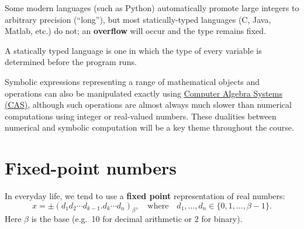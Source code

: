 \documentclass[
  letterpaper,
  DIV=11,
  numbers=noendperiod]{scrreprt}
\begin{document}
\begin{tcolorbox}[enhanced jigsaw, toptitle=1mm, breakable, colbacktitle=quarto-callout-note-color!10!white, colback=white, opacitybacktitle=0.6, rightrule=.15mm, bottomrule=.15mm, left=2mm, arc=.35mm, bottomtitle=1mm, title=\textcolor{quarto-callout-note-color}{\faInfo}\hspace{0.5em}{Note}, titlerule=0mm, toprule=.15mm, leftrule=.75mm, opacityback=0, colframe=quarto-callout-note-color-frame, coltitle=black]

Some modern languages (such as Python) automatically promote large
integers to arbitrary precision (``long''), but most statically-typed
languages (C, Java, Matlab, etc.) do not; an \textbf{overflow} will
occur and the type remains fixed.

\end{tcolorbox}

\begin{tcolorbox}[enhanced jigsaw, toptitle=1mm, breakable, colbacktitle=quarto-callout-note-color!10!white, colback=white, opacitybacktitle=0.6, rightrule=.15mm, bottomrule=.15mm, left=2mm, arc=.35mm, bottomtitle=1mm, title=\textcolor{quarto-callout-note-color}{\faInfo}\hspace{0.5em}{Note}, titlerule=0mm, toprule=.15mm, leftrule=.75mm, opacityback=0, colframe=quarto-callout-note-color-frame, coltitle=black]

A statically typed language is one in which the type of every variable
is determined before the program runs.

\end{tcolorbox}

Symbolic expressions representing a range of mathematical objects and
operations can also be manipulated exactly using
\href{https://en.wikipedia.org/wiki/Computer_algebra_system}{Computer
Algebra Systems (CAS)}, although such operations are almost always much
slower than numerical computations using integer or real-valued numbers.
These dualities between numerical and symbolic computation will be a key
theme throughout the course.

\section{Fixed-point numbers}\label{fixed-point-numbers}

In everyday life, we tend to use a \textbf{fixed point} representation
of real numbers: \[
x = \pm (d_1d_2\cdots d_{k-1}.d_k\cdots d_n)_\beta, \quad \textrm{where} \quad d_1,\ldots,d_n\in\{0,1,\ldots,\beta - 1\}.
\] Here \(\beta\) is the base (e.g.~10 for decimal arithmetic or 2 for
binary).
\end{document}
